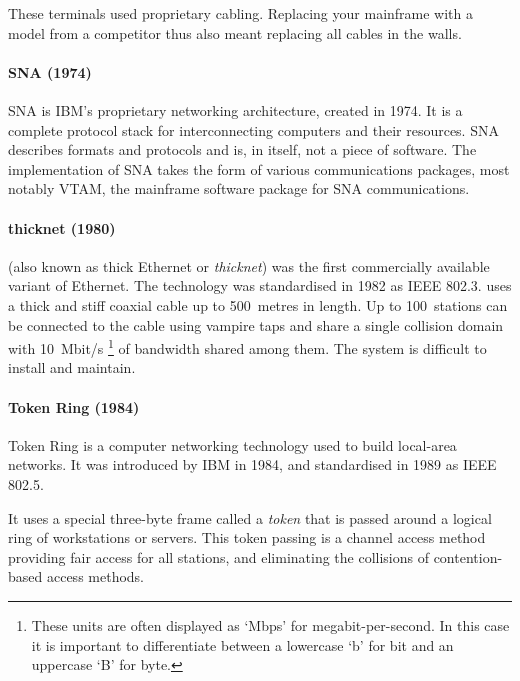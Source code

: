 These terminals used proprietary cabling.
Replacing your mainframe with a model from a competitor thus also meant replacing all cables in the walls.
    
\paragraph{\acl{SNA} (1974)}
\Gls{SNA} is IBM's proprietary networking architecture, created in 1974.
It is a complete protocol stack for interconnecting computers and their resources.
\gls{SNA} describes formats and protocols and is, in itself, not a piece of software.
The implementation of \gls{SNA} takes the form of various communications packages, most notably \gls{VTAM}, the mainframe software package for \gls{SNA} communications.
    
\paragraph{thicknet (1980)}%
 (also known as thick Ethernet or \emph{thicknet}) was the first commercially available variant of Ethernet.
The technology was standardised in 1982 as \acs{IEEE} 802.3.
 uses a thick and stiff coaxial cable up to 500~metres in length.
Up to 100~stations can be connected to the cable using vampire taps and share a single collision domain with 10~Mbit/s%
   \footnote{These units are often displayed as `Mbps' for megabit-per-second. In this case it is important to differentiate between a lowercase `b' for bit and an uppercase `B' for byte.}
of bandwidth shared among them.
The system is difficult to install and maintain.

\paragraph{Token Ring (1984)}%
Token Ring is a computer networking technology used to build local-area networks.
It was introduced by IBM in 1984, and standardised in 1989 as \acs{IEEE} 802.5.

It uses a special three-byte frame called a \emph{token} that is passed around a logical ring of workstations or servers.
This token passing is a channel access method providing fair access for all stations, and eliminating the collisions of contention-based access methods.

